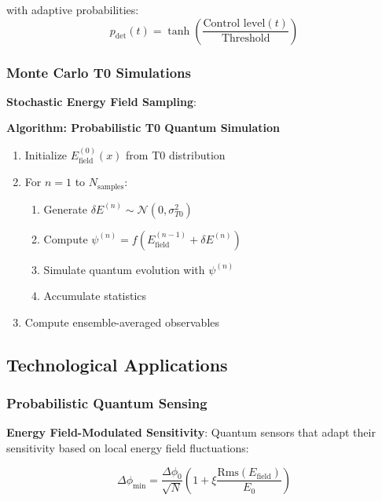 \documentclass[12pt,a4paper]{article}
\newcommand{\xipar}{\xi}
\theoremstyle{definition}
\theoremstyle{remark}
\begin{document}
with adaptive probabilities:
\begin{equation}
	p_{\text{det}}(t) = \tanh\left(\frac{\text{Control level}(t)}{\text{Threshold}}\right)
	\label{eq:adaptive_probabilities_en}
\end{equation}

\subsubsection{Monte Carlo T0 Simulations}

\textbf{Stochastic Energy Field Sampling}:

\textbf{Algorithm: Probabilistic T0 Quantum Simulation}
\begin{enumerate}
	\item Initialize $E_{\text{field}}^{(0)}(x)$ from T0 distribution
	\item For $n = 1$ to $N_{\text{samples}}$:
	\begin{enumerate}
		\item Generate $\delta E^{(n)} \sim \mathcal{N}(0, \sigma_{T0}^2)$
		\item Compute $\psi^{(n)} = f(E_{\text{field}}^{(n-1)} + \delta E^{(n)})$
		\item Simulate quantum evolution with $\psi^{(n)}$
		\item Accumulate statistics
	\end{enumerate}
	\item Compute ensemble-averaged observables
\end{enumerate}

\subsection{Technological Applications}

\subsubsection{Probabilistic Quantum Sensing}

\textbf{Energy Field-Modulated Sensitivity}:
Quantum sensors that adapt their sensitivity based on local energy field fluctuations:

\begin{equation}
	\Delta \phi_{\text{min}} = \frac{\Delta \phi_0}{\sqrt{N}} \left(1 + \xipar \frac{\text{Rms}(E_{\text{field}})}{E_0}\right)
	\label{eq:adaptive_sensitivity_en}
\end{equation}
\end{document}

